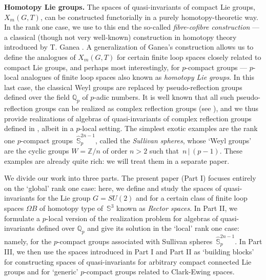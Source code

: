 \documentclass[11pt]{amsart}
\theoremstyle{definition}
\theoremstyle{remark}
\numberwithin{equation}{section}
\def\bS{\mathbb S}
\def\Z{\mathbb{Z}}
\def\Q{\mathbb{Q}}
\begin{document}
\vspace*{1ex}

\noindent
{\bf Homotopy Lie groups.} The spaces  of quasi-invariants of compact Lie groups, $ X_m(G,T) $, can be constructed functorially in a purely homotopy-theoretic way. In the rank one case, we use to this end the so-called {\it fibre-cofibre construction} --- a classical (though not very well-known) construction in homotopy theory introduced by T. Ganea \cite{Ga65}.  A generalization of Ganea's construction allows us to define the analogues of $ X_m(G,T) $ for certain finite loop spaces closely related to compact Lie groups, and perhaps most interestingly, for $p$-compact  groups --- $p$-local analogues of finite loop spaces also known as {\it homotopy Lie groups}. In this last case, the classical Weyl groups are replaced by pseudo-reflection groups defined over the field  $\Q_p$ of $p$-adic numbers. It is well known that all such pseudo-reflection groups can be realized as complex reflection groups (see \cite{CE74}), and we thus  provide realizations of algebras of quasi-invariants of complex reflection groups defined in \cite{BC11},
albeit in a $p$-local setting. The simplest exotic examples are the rank one $p$-compact groups 
$\, \hat{\bS}^{2n-1}_p $, called the {\it Sullivan spheres}, whose `Weyl groups' are the cyclic groups $ W = \Z/n $ of order $ n>2 $ such that $\,n\,|\,(p-1)$. These examples are already quite rich: we will treat them in a separate paper.


\vspace*{1ex}

We divide our work into three parts. The present paper (Part I) focuses entirely on the
`global' rank one case: here, we define and study the spaces of quasi-invariants for the Lie group $  G = SU(2) $ and for a certain class of finite loop spaces $ \Omega B $
of homotopy type of $\, \bS^3 $ known as {\it Rector spaces}.
In Part II, we formulate a $p$-local version of the realization problem
for algebras of quasi-invariants defined over $ \Q_p $ and give its solution in the `local'
rank one case: namely, for the $p$-compact groups associated with Sullivan spheres $\, \hat{\bS}^{2n-1}_p $. In Part III, we then use the spaces introduced in
Part I and Part II as `building blocks' for constructing spaces of quasi-invariants for arbitrary compact connected Lie groups and for `generic' $p$-compact groups related to Clark-Ewing spaces. 
\end{document}
